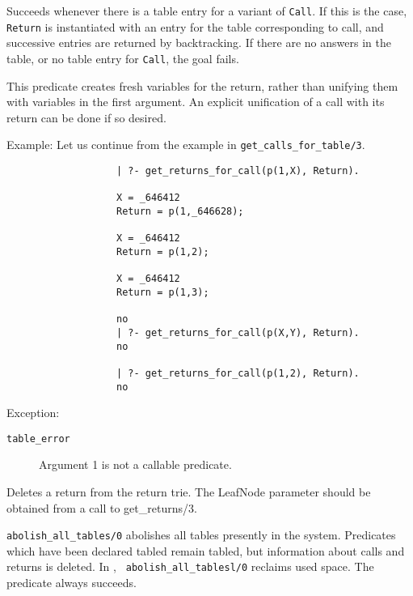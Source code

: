 \begin{description}
Succeeds whenever there is a table entry for a variant of {\tt Call}.
If this is the case, {\tt Return} is instantiated with an
entry for the table corresponding to call, and successive entries are returned
by backtracking.  If there are no answers in the table, or no table entry
for {\tt Call}, the goal fails.

This predicate creates fresh variables for the return, rather than
unifying them with variables in the first argument.  An explicit
unification of a call with its return can be done if so desired.

Example:
Let us continue from the example in {\tt get\_calls\_for\_table/3}.

    {\footnotesize
     \begin{verbatim}
                   | ?- get_returns_for_call(p(1,X), Return).

                   X = _646412
                   Return = p(1,_646628);

                   X = _646412
                   Return = p(1,2);

                   X = _646412
                   Return = p(1,3);

                   no
                   | ?- get_returns_for_call(p(X,Y), Return).
                   no

                   | ?- get_returns_for_call(p(1,2), Return).
                   no
      \end{verbatim}
      }

Exception:
    \begin{description}
    \item[{\tt table\_error}]
	Argument 1 is not a callable predicate.
    \end{description}



Deletes a return from the return trie. The LeafNode parameter should
be obtained from a call to get\_returns/3.


{\tt abolish\_all\_tables/0} abolishes all tables presently in the
system.  Predicates which have been declared tabled remain tabled, but
information about calls and returns is deleted.  In \version, {\tt
abolish\_all\_tablesl/0} reclaims used space.  The predicate always 
succeeds.


\end{description}

